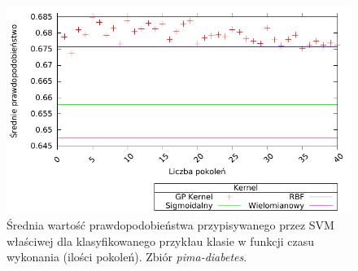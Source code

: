         \begin{figure}
                \includegraphics[scale=0.90]{figures/results/probability/probability-pima-diabetes}
                \caption{Średnia wartość prawdopodobieństwa przypisywanego przez SVM właściwej dla klasyfikowanego przykłau klasie w funkcji czasu wykonania (ilości pokoleń). Zbiór \emph{pima-diabetes}.\label{fig:probability-pima-diabetes}}
        \end{figure}



%
	
